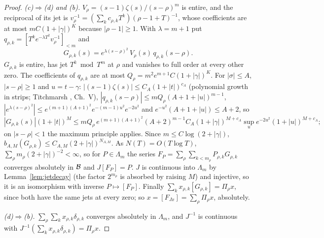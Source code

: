 \begin{proof}
\emph{(c)$\Rightarrow$(d) and (b).}
$V_\rho=(s-1)\zeta(s)/(s-\rho)^m$ is entire, and the reciprocal of its jet is $v_\rho^{-1}=(\sum_kc_{\rho,k}T^k)(\rho-1+T)^{-1}$, whose coefficients are at most $mC(1+|\gamma|)^K$ because $|\rho-1|\ge1$.
With $\lambda=m+1$ put $q_{\rho,k}=[T^ke^{-\lambda T^2}v_\rho^{-1}]_{<m}$ and
\[
G_{\rho,k}(s)=e^{\lambda(s-\rho)^2}\,V_\rho(s)\,q_{\rho,k}(s-\rho).
\]
$G_{\rho,k}$ is entire, has jet $T^k\bmod T^m$ at $\rho$ and vanishes to full order at every other zero. The coefficients of $q_{\rho,k}$ are at most $Q_\rho=m^2e^{m+1}C(1+|\gamma|)^K$.
For $|\sigma|\le A$, $|s-\rho|\ge1$ and $u=t-\gamma$: $|(s-1)\zeta(s)|\le C_A(1+|t|)^{c_A}$ (polynomial growth in strips; Titchmarsh \cite{Titchmarsh}, Ch.~V), $|q_{\rho,k}(s-\rho)|\le mQ_\rho(A+1+|u|)^{m-1}$, $|e^{\lambda(s-\rho)^2}|\le e^{(m+1)(A+1)^2}e^{-(m-1)u^2}e^{-2u^2}$ and $e^{-u^2}(A+1+|u|)\le A+2$, so
\[
|G_{\rho,k}(s)|(1+|t|)^M\le mQ_\rho\,e^{(m+1)(A+1)^2}(A+2)^{m-1}C_A(1+|\gamma|)^{M+c_A}\sup_ue^{-2u^2}(1+|u|)^{M+c_A};
\]
on $|s-\rho|<1$ the maximum principle applies. Since $m\le C\log(2+|\gamma|)$, $b_{A,M}(G_{\rho,k})\le C_{A,M}(2+|\gamma|)^{N_{A,M}}$.
As $N(T)=O(T\log T)$, $\sum_\rho m_\rho(2+|\gamma|)^{-2}<\infty$, so for $P\in\Lambda_m$ the series $F_P=\sum_\rho\sum_{k<m_\rho}P_{\rho,k}G_{\rho,k}$ converges absolutely in $\mathcal{B}$ and $J[F_P]=P$.
$J$ is continuous into $\Lambda_m$ by Lemma~\ref{lem:jetdecay} (the factor $2^{m_\rho}$ is absorbed by raising $M$) and injective, so it is an isomorphism with inverse $P\mapsto[F_P]$.
Finally $\sum_kx_{\rho,k}[G_{\rho,k}]=\Pi_\rho x$, since both have the same jets at every zero; so $x=[F_{Jx}]=\sum_\rho\Pi_\rho x$, absolutely.

\emph{(d)$\Rightarrow$(b).} $\sum_\rho\sum_kx_{\rho,k}\delta_{\rho,k}$ converges absolutely in $\Lambda_m$, and $J^{-1}$ is continuous with $J^{-1}(\sum_kx_{\rho,k}\delta_{\rho,k})=\Pi_\rho x$.
\end{proof}


